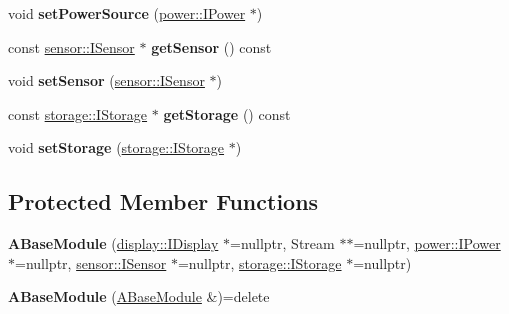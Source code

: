 \begin{DoxyCompactItemize}
\mbox{\label{classwood_box_1_1module_1_1_a_base_module_a117ce9fbbcef048ccde38f0b6a11aa91}} 
void {\bfseries set\+Power\+Source} (\mbox{\hyperlink{classwood_box_1_1power_1_1_i_power}{power\+::\+I\+Power}} $\ast$)
\item 
\mbox{\label{classwood_box_1_1module_1_1_a_base_module_a73004296826a55c3d24c2212b7165569}} 
const \mbox{\hyperlink{classwood_box_1_1sensor_1_1_i_sensor}{sensor\+::\+I\+Sensor}} $\ast$ {\bfseries get\+Sensor} () const
\item 
\mbox{\label{classwood_box_1_1module_1_1_a_base_module_ac3fd88feae532ca88b14642f76ef8def}} 
void {\bfseries set\+Sensor} (\mbox{\hyperlink{classwood_box_1_1sensor_1_1_i_sensor}{sensor\+::\+I\+Sensor}} $\ast$)
\item 
\mbox{\label{classwood_box_1_1module_1_1_a_base_module_afaa761163e3e88fbeb26a1699eaccb78}} 
const \mbox{\hyperlink{classwood_box_1_1storage_1_1_i_storage}{storage\+::\+I\+Storage}} $\ast$ {\bfseries get\+Storage} () const
\item 
\mbox{\label{classwood_box_1_1module_1_1_a_base_module_af9e009af37d04062c2da7d977baded80}} 
void {\bfseries set\+Storage} (\mbox{\hyperlink{classwood_box_1_1storage_1_1_i_storage}{storage\+::\+I\+Storage}} $\ast$)
\end{DoxyCompactItemize}
\subsection*{Protected Member Functions}
\begin{DoxyCompactItemize}
\item 
\mbox{\label{classwood_box_1_1module_1_1_a_base_module_a40edd799ba7342abfaf5cb06e60a4b04}} 
{\bfseries A\+Base\+Module} (\mbox{\hyperlink{classwood_box_1_1display_1_1_i_display}{display\+::\+I\+Display}} $\ast$=nullptr, Stream $\ast$$\ast$=nullptr, \mbox{\hyperlink{classwood_box_1_1power_1_1_i_power}{power\+::\+I\+Power}} $\ast$=nullptr, \mbox{\hyperlink{classwood_box_1_1sensor_1_1_i_sensor}{sensor\+::\+I\+Sensor}} $\ast$=nullptr, \mbox{\hyperlink{classwood_box_1_1storage_1_1_i_storage}{storage\+::\+I\+Storage}} $\ast$=nullptr)
\item 
\mbox{\label{classwood_box_1_1module_1_1_a_base_module_a2ba8fdaace63960a0696b77bee60b64b}} 
{\bfseries A\+Base\+Module} (\mbox{\hyperlink{classwood_box_1_1module_1_1_a_base_module}{A\+Base\+Module}} \&)=delete
\end{DoxyCompactItemize}
